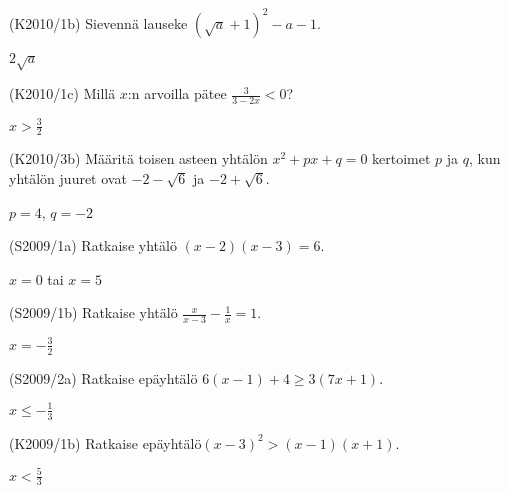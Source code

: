 \begin{multicols}{2}
\begin{tehtava}
(K2010/1b) Sievennä lauseke $(\sqrt{a}+1)^2-a-1$.
\begin{vastaus}
$2\sqrt{a}$
\end{vastaus}
\end{tehtava}

\begin{tehtava}
(K2010/1c) Millä $x$:n arvoilla pätee $\frac{3}{3-2x}<0$?
\begin{vastaus}
$x>\frac{3}{2}$
\end{vastaus}
\end{tehtava}


\begin{tehtava}
(K2010/3b) Määritä toisen asteen yhtälön $x^2+px+q=0$ kertoimet $p$ ja $q$, kun yhtälön juuret ovat $-2-\sqrt{6}$ ja $-2+\sqrt{6}$.
\begin{vastaus}
$p=4$, $q=-2$
\end{vastaus}
\end{tehtava}

\begin{tehtava}
(S2009/1a) Ratkaise yhtälö $(x-2)(x-3)=6$. 
\begin{vastaus}
$x=0$ tai $x=5$
\end{vastaus}
\end{tehtava}

\begin{tehtava}
(S2009/1b) Ratkaise yhtälö $\frac{x}{x-3}-\frac{1}{x}=1$.
\begin{vastaus}
$x=-\frac{3}{2}$
\end{vastaus}
\end{tehtava}

\begin{tehtava}
(S2009/2a) Ratkaise epäyhtälö $6(x-1)+4 \geq 3(7x+1)$. 
\begin{vastaus}
$x \leq -\frac{1}{3}$
\end{vastaus}
\end{tehtava}


\begin{tehtava}
(K2009/1b) Ratkaise epäyhtälö$(x-3)^2>(x-1)(x+1)$.
\begin{vastaus}
$x<\frac{5}{3}$
\end{vastaus}
\end{tehtava}


\end{multicols}
